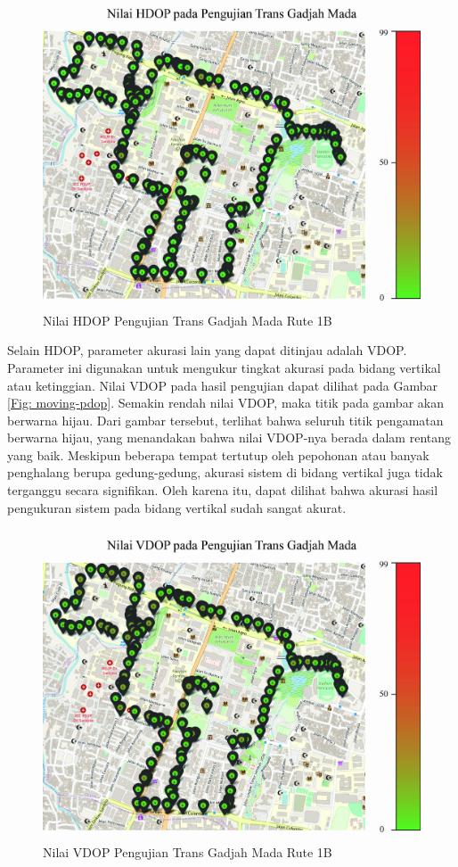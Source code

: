\begin{figure}[H]
	\centering
	\includegraphics[width=12cm]{contents/chapter-4/pengujian-bergerak/moving-HDOP.jpg}
	\caption{Nilai HDOP Pengujian Trans Gadjah Mada Rute 1B}
	\label{Fig: moving-hdop}
\end{figure}

Selain HDOP, parameter akurasi lain yang dapat ditinjau adalah VDOP. Parameter ini digunakan untuk mengukur tingkat akurasi pada bidang vertikal atau ketinggian. Nilai VDOP pada hasil pengujian dapat dilihat pada Gambar \ref{Fig: moving-pdop}. Semakin rendah nilai VDOP, maka titik pada gambar akan berwarna hijau. Dari gambar tersebut, terlihat bahwa seluruh titik pengamatan berwarna hijau, yang menandakan bahwa nilai VDOP-nya berada dalam rentang yang baik. Meskipun beberapa tempat tertutup oleh pepohonan atau banyak penghalang berupa gedung-gedung, akurasi sistem di bidang vertikal juga tidak terganggu secara signifikan. Oleh karena itu, dapat dilihat bahwa akurasi hasil pengukuran sistem pada bidang vertikal sudah sangat akurat.

\begin{figure}[H]
	\centering
	\includegraphics[width=12cm]{contents/chapter-4/pengujian-bergerak/moving-VDOP.jpg}
	\caption{Nilai VDOP Pengujian Trans Gadjah Mada Rute 1B}
	\label{Fig: moving-vdop}
\end{figure}

